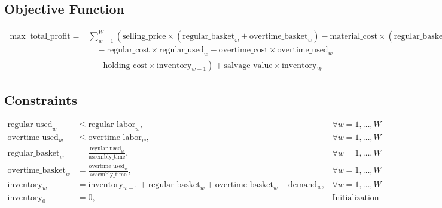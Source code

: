 \documentclass{article}
\begin{document}
\subsection*{Objective Function}
\begin{align*}
    \max \; \text{total\_profit} = & \sum_{w=1}^{W} \left( \text{selling\_price} \times (\text{regular\_basket}_w + \text{overtime\_basket}_w) - \text{material\_cost} \times (\text{regular\_basket}_w + \text{overtime\_basket}_w) \right.\\
    & \quad - \text{regular\_cost} \times \text{regular\_used}_w - \text{overtime\_cost} \times \text{overtime\_used}_w \\
    & \quad \left. - \text{holding\_cost} \times \text{inventory}_{w-1} \right) + \text{salvage\_value} \times \text{inventory}_W
\end{align*}

\subsection*{Constraints}
\begin{align}
    \text{regular\_used}_w & \leq \text{regular\_labor}_w, & \forall w = 1, \ldots, W \\
    \text{overtime\_used}_w & \leq \text{overtime\_labor}_w, & \forall w = 1, \ldots, W \\
    \text{regular\_basket}_w & = \frac{\text{regular\_used}_w}{\text{assembly\_time}}, & \forall w = 1, \ldots, W \\
    \text{overtime\_basket}_w & = \frac{\text{overtime\_used}_w}{\text{assembly\_time}}, & \forall w = 1, \ldots, W \\
    \text{inventory}_w & = \text{inventory}_{w-1} + \text{regular\_basket}_w + \text{overtime\_basket}_w - \text{demand}_w, & \forall w = 1, \ldots, W \\
    \text{inventory}_0 & = 0, & \text{Initialization}
\end{align}
\end{document}
